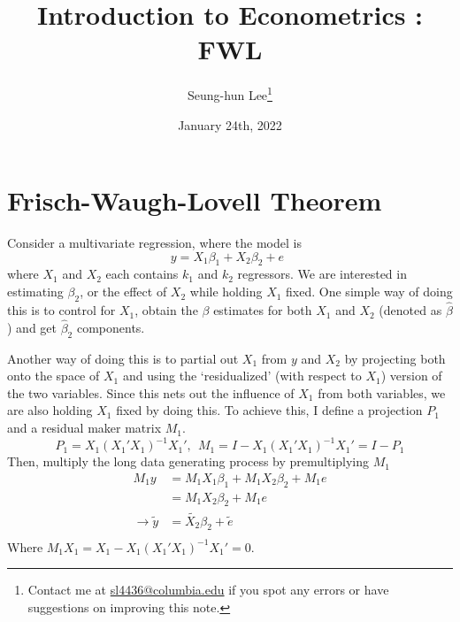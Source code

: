 \documentclass[12pt]{article}
\title{Introduction to Econometrics \ROM{2}: FWL}
\theoremstyle{definition}
\theoremstyle{property}
\theoremstyle{assumption}
\theoremstyle{example}
\theoremstyle{comment}
\begin{document}
\linespread{1.25}
\onehalfspacing

\author{Seung-hun Lee\footnote{Contact me at \href{mailto:sl4436@columbia.edu}{sl4436@columbia.edu} if you spot any errors or have suggestions on improving this note.}}
\date{January 24th, 2022}
\maketitle
\thispagestyle{firstpage}

\section{Frisch-Waugh-Lovell Theorem}
Consider a multivariate regression, where the model is 
\[
y= X_1\beta_1 + X_2\beta_2+e \ \ \tag{Long}
\]
where $X_1$ and $X_2$ each contains $k_1$ and $k_2$ regressors. We are interested in estimating $\beta_2$, or the effect of $X_2$ while holding $X_1$ fixed. One simple way of doing this is to control for $X_1$, obtain the $\beta$ estimates for both $X_1$ and $X_2$ (denoted as $\hat{\beta}$) and get $\hat{\beta}_2$ components. 
\par
Another way of doing this is to partial out $X_1$ from $y$ and $X_2$ by projecting both onto the space of $X_1$ and using the `residualized' (with respect to $X_1$) version of the two variables. Since this nets out the influence of $X_1$ from both variables, we are also holding $X_1$ fixed by doing this. To achieve this, I define a projection $P_1$ and a residual maker matrix $M_1$.
\[
P_1= X_1(X_1'X_1)^{-1} X_1', \ \  M_1 = I-X_1(X_1'X_1)^{-1} X_1'=I-P_1
\]
Then, multiply the long data generating process by premultiplying $M_1$
\begin{align*}
M_1y &= M_1X_1\beta_1 + M_1X_2\beta_2+ M_1 e\\
&=M_1X_2\beta_2+ M_1 e\\
\to\widetilde{y}&=\widetilde{X_2}\beta_2 + \widetilde{e} \ \ \tag{Short}\\
\end{align*}
Where $M_1X_1 = X_1 - X_1(X_1'X_1)^{-1} X_1'=0$. 
\end{document}
